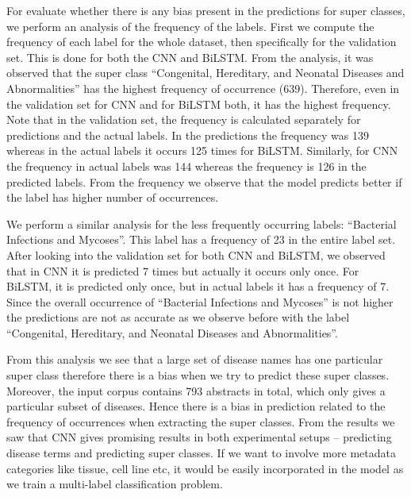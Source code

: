 For evaluate whether there is any bias present in the predictions for super classes, we perform an analysis of the frequency of the labels. First we compute the frequency of each label for the whole dataset, then specifically for the validation set. This is done for both the CNN and BiLSTM. 
From the analysis, it was observed that the super class ``Congenital, Hereditary, and Neonatal Diseases and Abnormalities'' has the highest frequency of occurrence (639). Therefore, even in the validation set for CNN and for BiLSTM both, it has the highest frequency. Note that in the validation set, the frequency is calculated separately for predictions and the actual labels. In the predictions the frequency was 139 whereas in the actual labels it occurs 125 times for BiLSTM. Similarly, for CNN the frequency in actual labels was 144 whereas the frequency is 126 in the predicted labels. From the frequency we observe that the model predicts better if the label has higher number of occurrences. 

We perform a similar analysis for the less frequently occurring labels: ``Bacterial Infections and Mycoses''. This label has a frequency of 23 in the entire label set. After looking into the validation set for both CNN and BiLSTM, we observed that in CNN it is predicted 7 times but actually it occurs only once. For BiLSTM, it is predicted only once, but in actual labels it has a frequency of 7. Since the overall occurrence of ``Bacterial Infections and Mycoses'' is not higher the predictions are not as accurate as we observe before with the label ``Congenital, Hereditary, and Neonatal Diseases and Abnormalities''.  

From this analysis we see that a large set of disease names has one particular super class therefore there is a bias when we try to predict these super classes. Moreover, the input corpus contains 793 abstracts in total, which only gives a particular subset of diseases. Hence there is a bias in prediction related to the frequency of occurrences when extracting the super classes. From the results we saw that CNN gives promising results in both experimental setups -- predicting disease terms and predicting super classes. If we want to involve more metadata categories like tissue, cell line etc, it would be easily incorporated in the model as we train a multi-label classification problem. 





